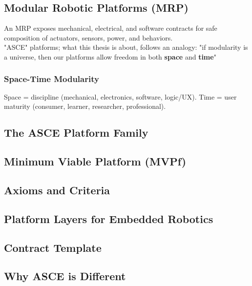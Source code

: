 \subsection{Modular Robotic Platforms (MRP)}
An MRP exposes mechanical, electrical, and software contracts for safe composition of actuators, sensors, power, and behaviors.\\
"ASCE" platforms; what this thesis is about, follows an analogy: "if modularity is a universe, then our platforms allow freedom in both \textbf{space} and \textbf{time}"

\subsubsection{Space-Time Modularity}
Space = discipline (mechanical, electronics, software, logic/UX). 
Time = user maturity (consumer, learner, researcher, professional).

\subsection{The ASCE Platform Family}

\subsection{Minimum Viable Platform (MVPf)}

\subsection{Axioms and Criteria}

\subsection{Platform Layers for Embedded Robotics}

\subsection{Contract Template}

\subsection{Why ASCE is Different}



